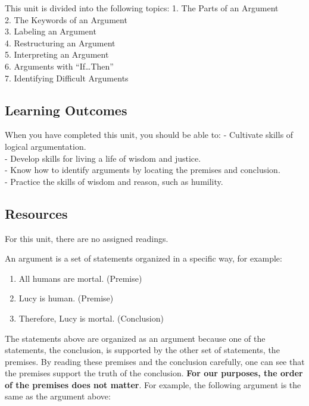 \documentclass[
]{book}
\begin{document}
This unit is divided into the following topics:
1. The Parts of an Argument\\
2. The Keywords of an Argument\\
3. Labeling an Argument\\
4. Restructuring an Argument\\
5. Interpreting an Argument\\
6. Arguments with ``If\ldots Then''\\
7. Identifying Difficult Arguments

\hypertarget{learning-outcomes-1}{%
\subsection*{Learning Outcomes}\label{learning-outcomes-1}}

When you have completed this unit, you should be able to:
- Cultivate skills of logical argumentation.\\
- Develop skills for living a life of wisdom and justice.\\
- Know how to identify arguments by locating the premises and conclusion.\\
- Practice the skills of wisdom and reason, such as humility.

\hypertarget{resources-1}{%
\subsection*{Resources}\label{resources-1}}

For this unit, there are no assigned readings.

An argument is a set of statements organized in a specific way, for example:

\begin{enumerate}
\def\labelenumi{\arabic{enumi}.}
\item
  All humans are mortal. (Premise)
\item
  Lucy is human. (Premise)
\item
  Therefore, Lucy is mortal. (Conclusion)
\end{enumerate}

The statements above are organized as an argument because one of the statements, the conclusion, is supported by the other set of statements, the premises. By reading these premises and the conclusion carefully, one can see that the premises support the truth of the conclusion. \textbf{For our purposes, the order of the premises does not matter}. For example, the following argument is the same as the argument above:
\end{document}
